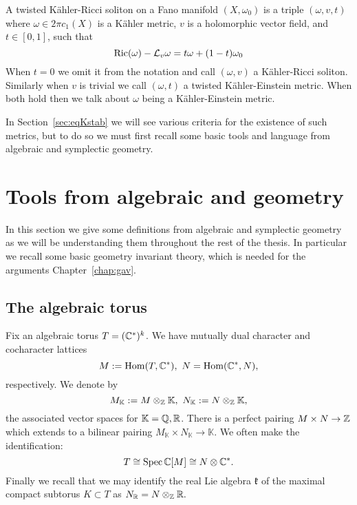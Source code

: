 \begin{definition} \label{def:tKRS}
A twisted K\"ahler-Ricci soliton on a Fano manifold \((X,\omega_0)\) is a triple \((\omega,v, t)\) where \(\omega \in 2 \pi c_1(X)\) is a K\"ahler metric, \(v\) is a holomorphic vector field, and \(t \in [0,1]\), such that
\[
\mathop{\rm Ric}\nolimits(\omega) - \mathcal{L}_v \omega = t \omega + (1-t) \omega_0
\]
When \(t = 0\) we omit it from the notation and call \((\omega,v)\) a K\"ahler-Ricci soliton. Similarly when \(v\) is trivial we call \((\omega,t)\) a twisted K\"ahler-Einstein metric. When both hold then we talk about \(\omega\) being a K\"ahler-Einstein metric.
\end{definition}

In Section~\ref{sec:eqKstab} we will see various criteria for the existence of such metrics, but to do so we must first recall some basic tools and language from algebraic and symplectic geometry.
\section{Tools from algebraic and geometry} \label{basics}
In this section we give some definitions from algebraic and symplectic geometry as we will be understanding them throughout the rest of the thesis. In particular we recall some basic geometry invariant theory, which is needed for the arguments Chapter~\ref{chap:gav}.
\subsection{The algebraic torus} \label{algtorus}
Fix an algebraic torus \(T = (\mathbb{C}^*)^k\). We have mutually dual character and cocharacter lattices
\[
M := \operatorname{Hom}(T,\mathbb{C}^*), \ N = \operatorname{Hom}(\mathbb{C}^*,N),
\]
respectively. We denote by
\[
M_\mathbb{K} := M \otimes_\ZZ \mathbb{K}, \ N_\mathbb{K} := N \otimes_\ZZ \mathbb{K},
\]
the associated vector spaces for \(\mathbb{K} = \mathbb{Q}, \mathbb{R}\). There is a perfect pairing \(M \times N \to \mathbb{Z}\) which extends to a bilinear pairing \(M_\mathbb{K} \times N_\mathbb{K} \to \mathbb{K}\). We often make the identification:
\[
T \cong \operatorname{Spec} \mathbb{C}[M] \cong N \otimes \mathbb{C}^*.
\]
Finally we recall that we may identify the real Lie algebra \(\mathfrak{k}\) of the maximal compact subtorus \(K \subset T\) as \( N_{\mathbb{R}} = N \otimes_{\mathbb{Z}} \mathbb{R}.\)
